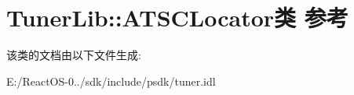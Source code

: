 \hypertarget{class_tuner_lib_1_1_a_t_s_c_locator}{}\section{Tuner\+Lib\+:\+:A\+T\+S\+C\+Locator类 参考}
\label{class_tuner_lib_1_1_a_t_s_c_locator}


该类的文档由以下文件生成\+:\begin{DoxyCompactItemize}
\item 
E\+:/\+React\+O\+S-\/0../sdk/include/psdk/tuner.\+idl\end{DoxyCompactItemize}
